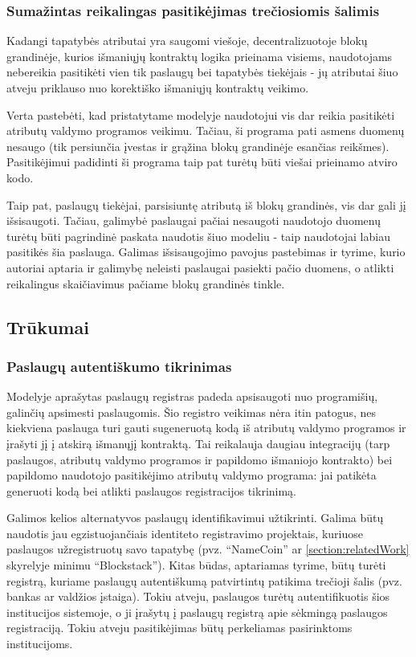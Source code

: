 \subsubsection{Sumažintas reikalingas pasitikėjimas trečiosiomis šalimis}

Kadangi tapatybės atributai yra saugomi viešoje, decentralizuotoje blokų grandinėje, kurios išmaniųjų kontraktų
logika prieinama visiems, naudotojams nebereikia pasitikėti vien tik paslaugų bei tapatybės tiekėjais - jų
atributai šiuo atveju priklauso nuo korektiško išmaniųjų kontraktų veikimo.

Verta pastebėti, kad
pristatytame modelyje naudotojui vis dar reikia pasitikėti atributų valdymo programos veikimu. Tačiau, ši programa pati
asmens duomenų nesaugo (tik persiunčia įvestas ir grąžina blokų grandinėje esančias reikšmes). Pasitikėjimui
padidinti ši programa taip pat turėtų būti viešai prieinamo atviro kodo.

Taip pat, paslaugų tiekėjai, parsisiuntę atributą
iš blokų grandinės, vis dar gali jį išsisaugoti. Tačiau, galimybė paslaugai pačiai nesaugoti naudotojo duomenų turėtų būti pagrindinė paskata
naudotis šiuo modeliu - taip naudotojai labiau pasitikės šia paslauga. Galimas išsisaugojimo pavojus pastebimas ir
\cite{MITPaper} tyrime, kurio autoriai aptaria ir galimybę neleisti paslaugai pasiekti pačio duomens, o atlikti
reikalingus skaičiavimus pačiame blokų grandinės tinkle.

\subsection{Trūkumai}

\subsubsection{Paslaugų autentiškumo tikrinimas}

Modelyje aprašytas paslaugų registras padeda apsisaugoti nuo programišių, galinčių apsimesti paslaugomis. Šio registro veikimas
nėra itin patogus, nes kiekviena paslauga turi gauti sugeneruotą kodą iš atributų valdymo programos ir įrašyti jį į atskirą išmanųjį kontraktą.
Tai reikalauja daugiau integracijų (tarp paslaugos, atributų valdymo programos ir papildomo išmaniojo kontrakto)
bei papildomo naudotojo pasitikėjimo atributų valdymo programa: jai patikėta generuoti kodą bei atlikti paslaugos registracijos
tikrinimą.

Galimos kelios alternatyvos paslaugų identifikavimui užtikrinti. Galima būtų naudotis jau egzistuojančiais identiteto
registravimo projektais, kuriuose paslaugos užregistruotų savo tapatybę (pvz. \enquote{NameCoin} ar \hypertarget{section:relatedWork}{\ref{section:relatedWork}}
skyrelyje minimu \enquote{Blockstack}). Kitas būdas, aptariamas \cite{Baars2016} tyrime, būtų turėti registrą, kuriame paslaugų autentiškumą
patvirtintų patikima trečioji šalis (pvz. bankas ar valdžios įstaiga). Tokiu atveju, paslaugos turėtų autentifikuotis šios institucijos
sistemoje, o ji įrašytų į paslaugų registrą apie sėkmingą paslaugos registraciją. Tokiu atveju pasitikėjimas būtų perkeliamas
pasirinktoms institucijoms.

